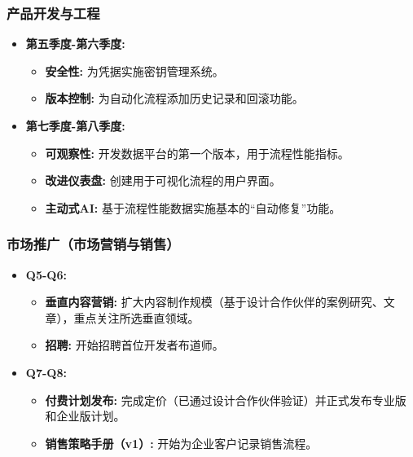 \documentclass[11pt, a4paper, oneside]{article}
\begin{document}
\subsubsection{产品开发与工程}
\begin{itemize}[leftmargin=*]
    \item \textbf{第五季度-第六季度:}
    \begin{itemize}
        \item \textbf{安全性:} 为凭据实施密钥管理系统。
        \item \textbf{版本控制:} 为自动化流程添加历史记录和回滚功能。
    \end{itemize}
    \item \textbf{第七季度-第八季度:}
    \begin{itemize}
        \item \textbf{可观察性:} 开发数据平台的第一个版本，用于流程性能指标。
        \item \textbf{改进仪表盘:} 创建用于可视化流程的用户界面。
        \item \textbf{主动式AI:} 基于流程性能数据实施基本的“自动修复”功能。
    \end{itemize}
\end{itemize}

\subsubsection{市场推广（市场营销与销售）}
\begin{itemize}[leftmargin=*]
    \item \textbf{Q5-Q6:}
    \begin{itemize}
        \item \textbf{垂直内容营销:} 扩大内容制作规模（基于设计合作伙伴的案例研究、文章），重点关注所选垂直领域。
        \item \textbf{招聘:} 开始招聘首位开发者布道师。
    \end{itemize}
    \item \textbf{Q7-Q8:}
    \begin{itemize}
        \item \textbf{付费计划发布:} 完成定价（已通过设计合作伙伴验证）并正式发布专业版和企业版计划。
        \item \textbf{销售策略手册（v1）:} 开始为企业客户记录销售流程。
    \end{itemize}
\end{itemize}

\clearpage

\end{document}
